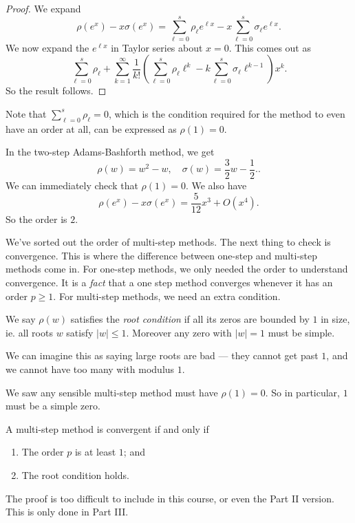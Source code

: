 \documentclass[a4paper]{article}
\begin{document}
\begin{proof}
  We expand
  \[
    \rho(e^x) - x \sigma(e^x) = \sum_{\ell = 0}^s \rho_\ell e^{\ell x} - x \sum_{\ell = 0}^s \sigma_\ell e^{\ell x}.
  \]
  We now expand the $e^{\ell x}$ in Taylor series about $x = 0$. This comes out as
  \[
    \sum_{\ell = 0}^s \rho_\ell + \sum_{k = 1}^\infty \frac{1}{k!} \left(\sum_{\ell = 0}^s \rho_\ell \ell^k - k \sum_{\ell = 0}^s \sigma_\ell \ell^{k - 1}\right) x^k.
  \]
  So the result follows.
\end{proof}
Note that $\sum_{\ell = 0}^s \rho_\ell = 0$, which is the condition required for the method to even have an order at all, can be expressed as $\rho(1) = 0$.

\begin{eg}[AB2]
  In the two-step Adams-Bashforth method, we get
  \[
    \rho(w) = w^2 - w,\quad \sigma(w) = \frac{3}{2} w - \frac{1}{2}..
  \]
  We can immediately check that $\rho(1) = 0$. We also have
  \[
    \rho(e^x) - x \sigma(e^x) = \frac{5}{12} x^3 + O(x^4).
  \]
  So the order is $2$.
\end{eg}

We've sorted out the order of multi-step methods. The next thing to check is convergence. This is where the difference between one-step and multi-step methods come in. For one-step methods, we only needed the order to understand convergence. It is a \emph{fact} that a one step method converges whenever it has an order $p \geq 1$. For multi-step methods, we need an extra condition.

\begin{defi}
  We say $\rho(w)$ satisfies the \emph{root condition} if all its zeros are bounded by $1$ in size, ie. all roots $w$ satisfy $|w| \leq 1$. Moreover any zero with $|w| = 1$ must be simple.
\end{defi}
We can imagine this as saying large roots are bad --- they cannot get past $1$, and we cannot have too many with modulus $1$.

We saw any sensible multi-step method must have $\rho(1) = 0$. So in particular, $1$ must be a simple zero.

\begin{thm}
  A multi-step method is convergent if and only if
  \begin{enumerate}
    \item The order $p$ is at least $1$; and
    \item The root condition holds.
  \end{enumerate}
\end{thm}
The proof is too difficult to include in this course, or even the Part II version. This is only done in Part III.
\end{document}

